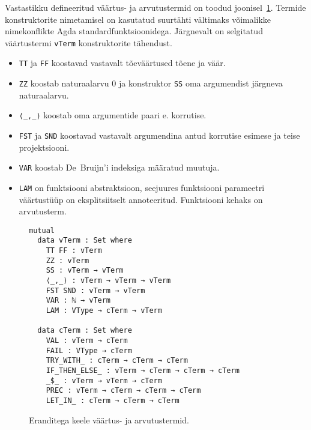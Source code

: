 \documentclass[a4paper,12pt]{article}
\begin{document}
Vastastikku defineeritud väärtus- ja arvutustermid on toodud joonisel~\ref{fig:exc.raw}.
Termide konstruktorite nimetamisel on kasutatud suurtähti vältimaks võimalikke nimekonflikte Agda standardfunktsioonidega.
Järgnevalt on selgitatud väärtustermi {\tt vTerm} konstruktorite tähendust.
\begin{itemize}
\item {\tt TT} ja {\tt FF} koostavad vastavalt tõeväärtused tõene ja väär.
\item {\tt ZZ} koostab naturaalarvu 0 ja konstruktor {\tt SS} oma argumendist järgneva naturaalarvu.
\item {\tt ⟨_,_⟩} koostab oma argumentide paari e. korrutise.
\item {\tt FST} ja {\tt SND} koostavad vastavalt argumendina antud korrutise esimese ja teise projektsiooni.
\item {\tt VAR} koostab De~Bruijn'i indeksiga määratud muutuja.
\item {\tt LAM} on funktsiooni abstraktsioon, seejuures funktsiooni parameetri väärtustüüp on eksplitsiitselt annoteeritud. Funktsiooni kehaks on arvutusterm.
\end{itemize}
\begin{figure}
  \begin{BVerbatim}
mutual
  data vTerm : Set where
    TT FF : vTerm
    ZZ : vTerm
    SS : vTerm → vTerm
    ⟨_,_⟩ : vTerm → vTerm → vTerm
    FST SND : vTerm → vTerm
    VAR : ℕ → vTerm
    LAM : VType → cTerm → vTerm

  data cTerm : Set where
    VAL : vTerm → cTerm
    FAIL : VType → cTerm
    TRY_WITH_ : cTerm → cTerm → cTerm
    IF_THEN_ELSE_ : vTerm → cTerm → cTerm → cTerm
    _$_ : vTerm → vTerm → cTerm
    PREC : vTerm → cTerm → cTerm → cTerm
    LET_IN_ : cTerm → cTerm → cTerm
  \end{BVerbatim}
  \caption{Eranditega keele väärtus- ja arvutustermid.}
  \label{fig:exc.raw}
\end{figure}
\end{document}
